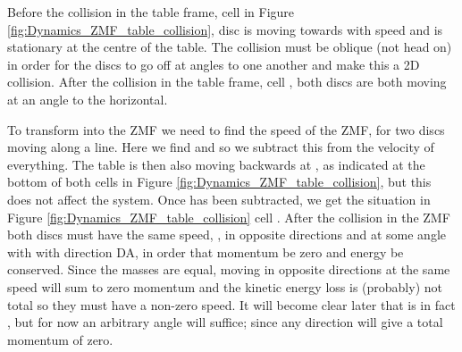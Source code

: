 \begin{problem}
{\begin{enumerate}

Before the collision in the table frame, cell  in Figure \ref{fig:Dynamics_ZMF_table_collision}, disc  is moving towards \vari{} with speed  and  is stationary at the centre of the table. The collision must be oblique (not head on) in order for the discs to go off at angles to one another and make this a 2D collision. After the collision in the table frame, cell , both discs are both moving at an angle  to the horizontal.

To transform into the ZMF we need to find the speed of the ZMF,  for two discs moving along a line. Here we find  and so we subtract this from the velocity of everything. The table is then also moving backwards at , as indicated at the bottom of both cells in Figure \ref{fig:Dynamics_ZMF_table_collision}, but this does not affect the system. Once  has been subtracted, we get the situation in Figure \ref{fig:Dynamics_ZMF_table_collision} cell .
After the collision in the ZMF both discs must have the same speed, , in opposite directions and at some angle \vari{\phi} with with direction DA, in order that momentum be zero and energy be conserved. Since the masses are equal, moving in opposite directions at the same speed will sum to zero momentum and the kinetic energy loss is (probably) not total so they must have a non-zero speed. It will become clear later that \vari{\phi} is in fact , but for now an arbitrary angle will suffice; since any direction will give a total momentum of zero.


\end{enumerate}}
\end{problem}
